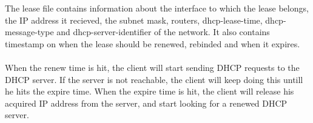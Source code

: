 

The lease file contains information about the interface to which the lease belongs, the IP address it recieved, the subnet mask, routers, dhcp-lease-time, dhcp-message-type and dhcp-server-identifier of the network. It also contains timestamp on when the lease should be renewed, rebinded and when it expires. \\ \\

When the renew time is hit, the client will start sending DHCP requests to the DHCP server. If the server is not reachable, the client will keep doing this untill he hits the expire time. When the expire time is hit, the client will release his acquired IP address from the server, and start looking for a renewed DHCP server.
